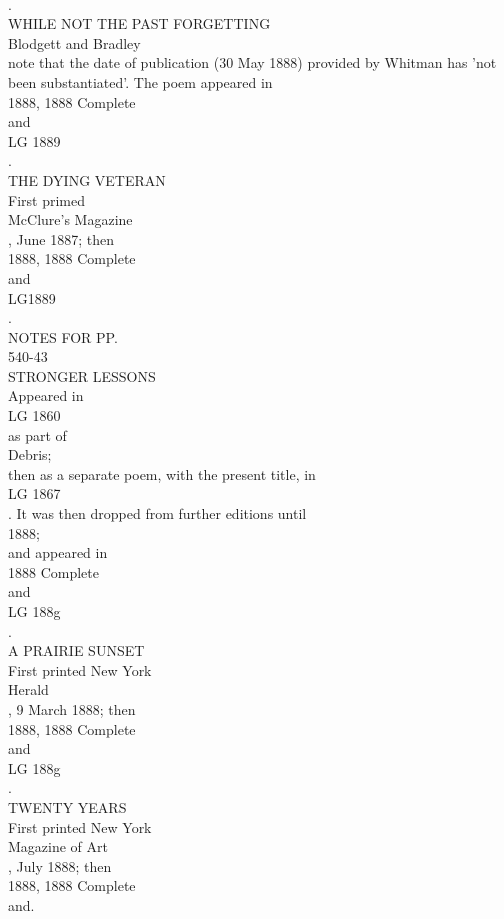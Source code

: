 \documentclass[smalldemyvopaper,11pt,twoside,onecolumn,openright,extrafontsizes]{memoir}
\newlength\drop
\begin{document}
\\.
\\WHILE NOT THE PAST FORGETTING
\\Blodgett and Bradley
\\note that the date of publication (30 May 1888) provided by Whitman has 'not been substantiated'. The poem appeared in
\\1888, 1888 Complete
\\and
\\LG 1889
\\.
\\THE DYING VETERAN
\\First primed
\\McClure's Magazine
\\, June 1887; then
\\1888, 1888 Complete
\\and
\\LG1889
\\.
\\NOTES FOR PP.
\\540-43
\\STRONGER LESSONS
\\Appeared in
\\LG 1860
\\as part of
\\Debris;
\\then as a separate poem, with the present title, in
\\LG 1867
\\. It was then dropped from further editions until
\\1888;
\\and appeared in
\\1888 Complete
\\and
\\LG 188g
\\.
\\A PRAIRIE SUNSET
\\First printed New York
\\Herald
\\, 9 March 1888; then
\\1888, 1888 Complete
\\and
\\LG 188g
\\.
\\TWENTY YEARS
\\First printed New York
\\Magazine of Art
\\, July 1888; then
\\1888, 1888 Complete
\\and.
\end{document}
